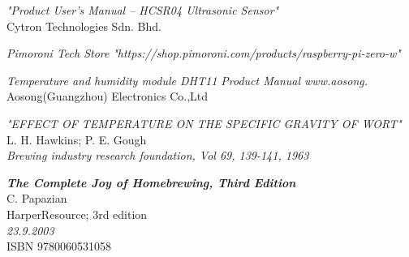 \documentclass[twoside]{ctuthesis}
\theoremstyle{plain}
\theoremstyle{definition}
\theoremstyle{note}
\begin{document}
\begin{thebibliography}{9}
	\textit{"Product User’s Manual – HCSR04 Ultrasonic Sensor"}\\
	Cytron Technologies Sdn. Bhd.
	
	\textit{Pimoroni Tech Store}
	\textit{"https://shop.pimoroni.com/products/raspberry-pi-zero-w"}
	
	\textit{Temperature and humidity module DHT11 Product Manual
		www.aosong.}\\
	Aosong(Guangzhou) Electronics Co.,Ltd
	
	\textit{"EFFECT OF TEMPERATURE ON THE SPECIFIC GRAVITY OF WORT"}\\
	L. H. Hawkins; P. E. Gough\\
	\textit{Brewing industry research foundation, Vol 69, 139-141, 1963}
	
	\textit{\textbf{The Complete Joy of Homebrewing, Third Edition}}\\
	C. Papazian\\
	HarperResource; 3rd edition\\
	\textit{23.9.2003}\\
	ISBN 9780060531058
	
\end{thebibliography}

\end{document}
